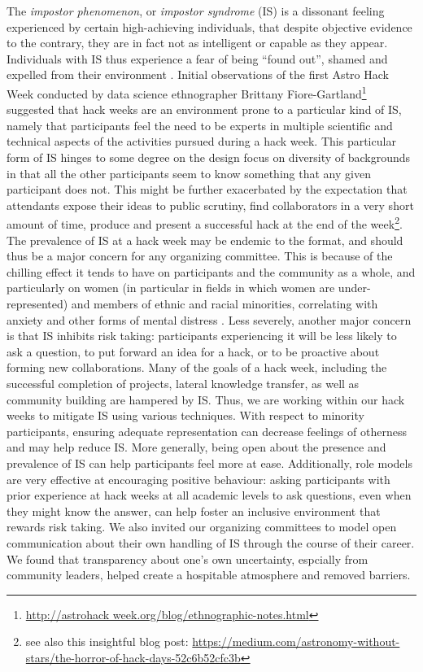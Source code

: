 \documentclass{aastex62}
\begin{document}
The \textit{impostor phenomenon}, or \textit{impostor syndrome} (IS) is a dissonant feeling experienced by certain high-achieving individuals, that despite objective evidence to the contrary, they are in fact not as intelligent or capable as they appear.
Individuals with IS thus experience a fear of being ``found out'', shamed and expelled from their environment \citep{Clance1978-ef}.
Initial observations of the first Astro Hack Week conducted by data science ethnographer Brittany Fiore-Gartland\footnote{\url{http://astrohack week.org/blog/ethnographic-notes.html}} suggested that hack weeks are an environment prone to a particular kind of IS, namely that participants feel the need to be experts in multiple scientific and technical aspects of the activities pursued during a hack week.
This particular form of IS hinges to some degree on the design focus on diversity of backgrounds in that all the other participants seem to know something that any given participant does not. This might be further exacerbated by the expectation that attendants expose their ideas to public scrutiny, find collaborators in a very short amount of time, produce and present a successful hack at the end of the week\footnote{see also this insightful blog post: \url{https://medium.com/astronomy-without-stars/the-horror-of-hack-days-52c6b52cfc3b}}.
The prevalence of IS at a hack week may be endemic to the format, and should thus be a major concern for any organizing committee.
This is because of the chilling effect it tends to have on participants and the community as a whole, and particularly on women (in particular in fields in which women are under-represented) and members of ethnic and racial minorities, correlating with anxiety and other forms of mental distress \citep{Parkman2016-ro}.
Less severely, another major concern is that IS inhibits risk taking: participants experiencing it will be less likely to ask a question, to put forward an idea for a hack, or to be proactive about forming new collaborations.
 Many of the goals of a hack week, including the successful completion of projects, lateral knowledge transfer, as well as community building are hampered by IS.
 Thus, we are working within our hack weeks to mitigate IS using various techniques.
With respect to minority participants, ensuring adequate representation can decrease feelings of otherness and may help reduce IS.
More generally, being open about the presence and prevalence of IS can help participants feel more at ease. %
Additionally, role models are very effective at encouraging positive behaviour: asking participants with prior experience at hack weeks at all academic levels to ask questions, even when they might know the answer, can help foster an inclusive environment that rewards risk taking. We also invited our organizing committees to model open communication about their own handling of IS through the course of their career. We found that transparency about one's own uncertainty, espcially from community leaders, helped create a hospitable atmosphere and removed barriers.
\end{document}
